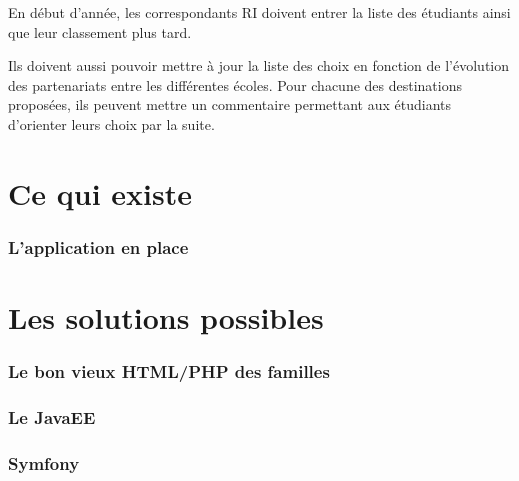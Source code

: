 \documentclass[10pt,a4paper]{article}
\begin{document}
		En début d'année, les correspondants RI doivent entrer la liste des étudiants ainsi que leur classement plus tard. 
		
		Ils doivent aussi pouvoir mettre à jour la liste des choix en fonction de l'évolution des partenariats entre les différentes écoles. Pour chacune des destinations proposées, ils peuvent mettre un commentaire permettant aux étudiants d'orienter leurs choix par la suite.
	
	\part{Ce qui existe}
	
		\section{L'application en place}
	
	\part{Les solutions possibles}
		
		\section{Le bon vieux HTML/PHP des familles}
		\section{Le JavaEE}
		\section{Symfony}
		
\end{document}
